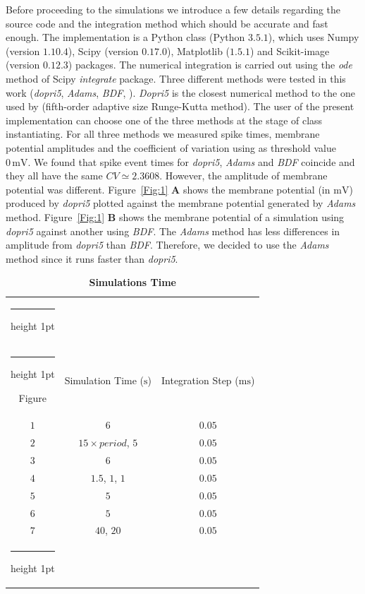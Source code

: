 \documentclass[10pt,a4paper,onecolumn]{article}
\makeatletter
\newcommand{\Rm}[1]{\mathrm{#1}}
\newcommand{\thickhline}{%
    \noalign {\ifnum 0=`}\fi \hrule height 1pt
    \futurelet \reserved@a \@xhline
}
\makeatother
\begin{document}
Before proceeding to the simulations we introduce a few details regarding 
the source code and the integration method which should be accurate and fast
enough. The implementation is a Python class (Python $3.5.1$), which uses
Numpy (version $1.10.4$), Scipy (version $0.17.0$), Matplotlib
($1.5.1$) and Scikit-image (version $0.12.3$) packages. The numerical
integration is carried out using the \emph{ode} method of Scipy 
\emph{integrate} package. Three different methods were tested in this work 
(\emph{dopri5}, \emph{Adams}, \emph{BDF}, \cite{ascher:1998}). \emph{Dopri5}
is the closest numerical method to the one used by \cite{wang:1994}
(fifth-order adaptive size Runge-Kutta method). The user of the present 
implementation can choose one of the three methods at the stage of class
instantiating. For all three methods we measured spike times, membrane
potential amplitudes and the coefficient of variation using as threshold value
$0\, \Rm{mV}$. We found that spike event times for \emph{dopri5}, \emph{Adams}
and \emph{BDF} coincide and they all have the same $CV \simeq 2.3608$. 
However, the amplitude of membrane potential was different. Figure~\ref{Fig:1}
{\bfseries \sffamily A} shows the membrane potential (in $\Rm{mV}$) produced by
\emph{dopri5} plotted against the membrane potential generated by \emph{Adams}
method. Figure~\ref{Fig:1} {\bfseries \sffamily B} shows the membrane potential
of a simulation using \emph{dopri5} against another using \emph{BDF}. The 
\emph{Adams} method has less differences in amplitude from \emph{dopri5} 
than \emph{BDF}. Therefore, we decided to use the \emph{Adams} method 
since it runs faster than \emph{dopri5}. 
\begin{table}[!htbp]
    \centering
    \begin{tabular}{ccc}
        \thickhline
        \multicolumn{3}{c}{Simulation Time} \\ \thickhline
        Figure & Simulation Time ($\Rm{s}$) & Integration Step ($\Rm{ms}$) \\ 
        \rowcolor{LightGray}
        $1$ & $6$ & $0.05$ \\ \rowcolor{Gray}
        $2$ & $15\times period$, $5$ & $0.05$ \\ \rowcolor{LightGray}
        $3$ & $6$ & $0.05$ \\ \rowcolor{Gray} 
        $4$ & $1.5$, $1$, $1$ & $0.05$ \\ \rowcolor{LightGray} 
        $5$ & $5$ & $0.05$  \\ \rowcolor{Gray} 
        $6$ & $5$ & $0.05$  \\ \rowcolor{LightGray} 
        $7$ & $40$, $20$ & $0.05$  \\ \thickhline
    \end{tabular}
    \caption{{\bfseries \sffamily Simulations Time}}
    \label{Table:2}
\end{table}
\end{document}
